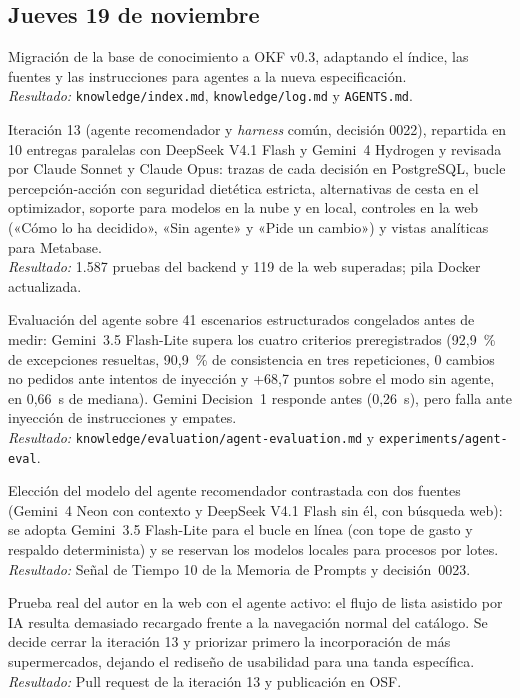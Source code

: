 \documentclass[11pt,a4paper]{article}
\newcommand{\actividad}[3]{\item[\textbf{[#1]}] #2 \\ \textit{Resultado:} #3}
\begin{document}
	\subsection*{Jueves 19 de noviembre}
	\begin{description}[leftmargin=0pt, itemsep=6pt]
		\actividad{Documentación}{Migración de la base de conocimiento a OKF v0.3, adaptando el índice, las fuentes y las instrucciones para agentes a la nueva especificación.}{\texttt{knowledge/index.md}, \texttt{knowledge/log.md} y \texttt{AGENTS.md}.}
		\actividad{Tarea}{Iteración 13 (agente recomendador y \textit{harness} común, decisión 0022), repartida en 10 entregas paralelas con DeepSeek V4.1 Flash y Gemini~4 Hydrogen y revisada por Claude Sonnet y Claude Opus: trazas de cada decisión en PostgreSQL, bucle percepción-acción con seguridad dietética estricta, alternativas de cesta en el optimizador, soporte para modelos en la nube y en local, controles en la web («Cómo lo ha decidido», «Sin agente» y «Pide un cambio») y vistas analíticas para Metabase.}{1.587 pruebas del backend y 119 de la web superadas; pila Docker actualizada.}
		\actividad{Análisis}{Evaluación del agente sobre 41 escenarios estructurados congelados antes de medir: Gemini~3.5 Flash-Lite supera los cuatro criterios preregistrados (92,9~\% de excepciones resueltas, 90,9~\% de consistencia en tres repeticiones, 0 cambios no pedidos ante intentos de inyección y +68,7 puntos sobre el modo sin agente, en 0,66~s de mediana). Gemini Decision~1 responde antes (0,26~s), pero falla ante inyección de instrucciones y empates.}{\texttt{knowledge/evaluation/agent-evaluation.md} y \texttt{experiments/agent-eval}.}
		\actividad{Decisión}{Elección del modelo del agente recomendador contrastada con dos fuentes (Gemini~4 Neon con contexto y DeepSeek V4.1 Flash sin él, con búsqueda web): se adopta Gemini~3.5 Flash-Lite para el bucle en línea (con tope de gasto y respaldo determinista) y se reservan los modelos locales para procesos por lotes.}{Señal de Tiempo 10 de la Memoria de Prompts y decisión~0023.}
		\actividad{Análisis}{Prueba real del autor en la web con el agente activo: el flujo de lista asistido por IA resulta demasiado recargado frente a la navegación normal del catálogo. Se decide cerrar la iteración 13 y priorizar primero la incorporación de más supermercados, dejando el rediseño de usabilidad para una tanda específica.}{Pull request de la iteración 13 y publicación en OSF.}
	\end{description}
\end{document}
